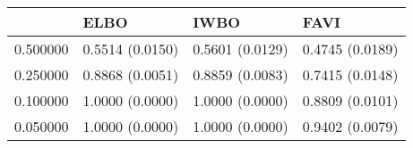 \begin{tabular}{llll}
\toprule
 & ELBO & IWBO & FAVI \\
\midrule
0.500000 & 0.5514 (0.0150) & 0.5601 (0.0129) & 0.4745 (0.0189) \\
0.250000 & 0.8868 (0.0051) & 0.8859 (0.0083) & 0.7415 (0.0148) \\
0.100000 & 1.0000 (0.0000) & 1.0000 (0.0000) & 0.8809 (0.0101) \\
0.050000 & 1.0000 (0.0000) & 1.0000 (0.0000) & 0.9402 (0.0079) \\
\bottomrule
\end{tabular}
